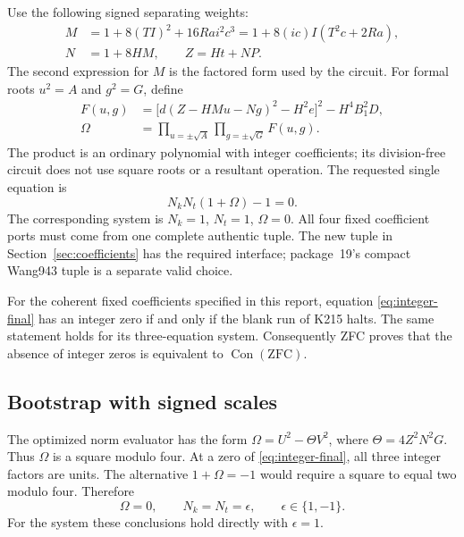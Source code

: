 Use the following signed separating weights:
\begin{align}
 M&=1+8(TI)^2+16Ra i^2c^3
     =1+8(ic)I(T^2c+2Ra),\label{eq:signed-weight}\\
 N&=1+8HM,\qquad Z=Ht+NP.\label{eq:signed-weight-N}
\end{align}
The second expression for $M$ is the factored form used by the circuit.
For formal roots $u^2=A$ and $g^2=G$, define
\begin{align}
 F(u,g)&=\bigl[d(Z-HMu-Ng)^2-H^2e\bigr]^2-H^4B_1^2D,
 \label{eq:signed-factor}\\
 \Omega&=\prod_{u=\pm\sqrt A}\prod_{g=\pm\sqrt G}F(u,g).
 \label{eq:signed-norm}
\end{align}
The product is an ordinary polynomial with integer coefficients; its
division-free circuit does not use square roots or a resultant operation.
The requested single equation is
\begin{equation}\label{eq:integer-final}
 \boxed{\;N_kN_t(1+\Omega)-1=0.\;}
\end{equation}
The corresponding system is $N_k=1$, $N_t=1$, $\Omega=0$.
All four fixed coefficient ports must come from one complete authentic
tuple. The new tuple in Section~\ref{sec:coefficients} has the required
interface; package~19's compact Wang943 tuple is a separate valid choice.

\begin{theorem}\label{thm:integer24}
For the coherent fixed coefficients specified in this report, equation
\eqref{eq:integer-final} has an integer zero if and only if the blank
run of K215 halts. The same statement holds for its three-equation system.
Consequently ZFC proves that the absence of integer zeros is equivalent
to $\operatorname{Con}(\mathrm{ZFC})$.
\end{theorem}

\subsection{Bootstrap with signed scales}

The optimized norm evaluator has the form
$\Omega=U^2-\Theta V^2$, where
$\Theta=4Z^2N^2G$. Thus $\Omega$ is a square modulo four.
At a zero of \eqref{eq:integer-final}, all three integer factors are
units. The alternative $1+\Omega=-1$ would require a square to equal
two modulo four. Therefore
\[
 \Omega=0,\qquad N_k=N_t=\epsilon,\qquad\epsilon\in\{1,-1\}.
\]
For the system these conclusions hold directly with $\epsilon=1$.

